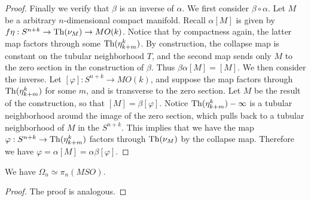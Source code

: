 \begin{proof}
		Finally we verify that $\beta$ is an inverse of $\alpha$. We first consider $\beta\circ\alpha$. Let $M$ be a arbitrary $n$-dimensional compact manifold. Recall $\alpha[M]$ is given by $f\eta:S^{n+k}\to\operatorname{\mathrm{Th}}(\nu_M)\to MO(k)$. Notice that by compactness again, the latter map factors through some $\operatorname{\mathrm{Th}}(\eta^k_{k+m})$. By construction, the collapse map is constant on the tubular neighborhood $T$, and the second map sends only $M$ to the zero section in the construction of $\beta$. Thus $\beta\alpha[M]=[M]$. We then consider the inverse. Let $[\varphi]:S^{n+k}\to MO(k)$, and suppose the map factors through $\operatorname{\mathrm{Th}}(\eta^k_{k+m})$ for some $m$, and is transverse to the zero section. Let $M$ be the result of the construction, so that $[M]=\beta[\varphi]$. Notice $\operatorname{\mathrm{Th}}(\eta^k_{k+m})-\infty$ is a tubular neighborhood around the image of the zero section, which pulls back to a tubular neighborhood of $M$ in the $S^{n+k}$. This implies that we have the map $\varphi:S^{n+k}\to\operatorname{\mathrm{Th}}(\eta^k_{k+m})$ factors through $\operatorname{\mathrm{Th}}(\nu_M)$ by the collapse map. Therefore we have $\varphi=\alpha[M]=\alpha\beta[\varphi]$. 
	\end{proof}
	\begin{coro}\label{MSO_oriented_cobordism}
		We have $\Omega_n\simeq\pi_n(MSO)$. 
	\end{coro}
	\begin{proof}
		The proof is analogous. 
	\end{proof}

